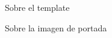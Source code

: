 \documentclass[a4paper,12pt,twopage]{book}
\begin{document}
Sobre el template 
%

Sobre la imagen de portada











\



\end{document}
